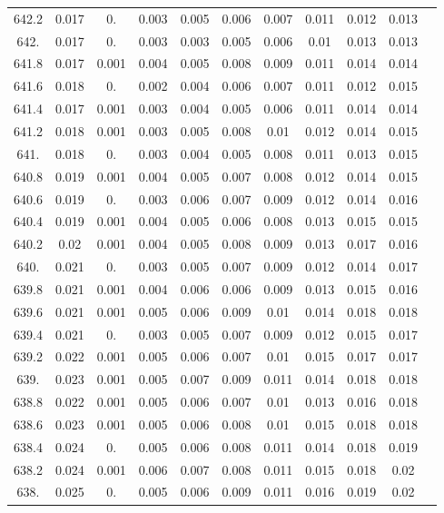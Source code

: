 \documentclass[12pt]{ctexart}
\numberwithin{equation}{section}
\begin{document}
\begin{longtable}{ccccccccccc}
642.2	&	0.017	&	0.	&	0.003	&	0.005	&	0.006	&	0.007	&	0.011	&	0.012	&	0.013	\\
642.	&	0.017	&	0.	&	0.003	&	0.003	&	0.005	&	0.006	&	0.01	&	0.013	&	0.013	\\
641.8	&	0.017	&	0.001	&	0.004	&	0.005	&	0.008	&	0.009	&	0.011	&	0.014	&	0.014	\\
641.6	&	0.018	&	0.	&	0.002	&	0.004	&	0.006	&	0.007	&	0.011	&	0.012	&	0.015	\\
641.4	&	0.017	&	0.001	&	0.003	&	0.004	&	0.005	&	0.006	&	0.011	&	0.014	&	0.014	\\
641.2	&	0.018	&	0.001	&	0.003	&	0.005	&	0.008	&	0.01	&	0.012	&	0.014	&	0.015	\\
641.	&	0.018	&	0.	&	0.003	&	0.004	&	0.005	&	0.008	&	0.011	&	0.013	&	0.015	\\
640.8	&	0.019	&	0.001	&	0.004	&	0.005	&	0.007	&	0.008	&	0.012	&	0.014	&	0.015	\\
640.6	&	0.019	&	0.	&	0.003	&	0.006	&	0.007	&	0.009	&	0.012	&	0.014	&	0.016	\\
640.4	&	0.019	&	0.001	&	0.004	&	0.005	&	0.006	&	0.008	&	0.013	&	0.015	&	0.015	\\
640.2	&	0.02	&	0.001	&	0.004	&	0.005	&	0.008	&	0.009	&	0.013	&	0.017	&	0.016	\\
640.	&	0.021	&	0.	&	0.003	&	0.005	&	0.007	&	0.009	&	0.012	&	0.014	&	0.017	\\
639.8	&	0.021	&	0.001	&	0.004	&	0.006	&	0.006	&	0.009	&	0.013	&	0.015	&	0.016	\\
639.6	&	0.021	&	0.001	&	0.005	&	0.006	&	0.009	&	0.01	&	0.014	&	0.018	&	0.018	\\
639.4	&	0.021	&	0.	&	0.003	&	0.005	&	0.007	&	0.009	&	0.012	&	0.015	&	0.017	\\
639.2	&	0.022	&	0.001	&	0.005	&	0.006	&	0.007	&	0.01	&	0.015	&	0.017	&	0.017	\\
639.	&	0.023	&	0.001	&	0.005	&	0.007	&	0.009	&	0.011	&	0.014	&	0.018	&	0.018	\\
638.8	&	0.022	&	0.001	&	0.005	&	0.006	&	0.007	&	0.01	&	0.013	&	0.016	&	0.018	\\
638.6	&	0.023	&	0.001	&	0.005	&	0.006	&	0.008	&	0.01	&	0.015	&	0.018	&	0.018	\\
638.4	&	0.024	&	0.	&	0.005	&	0.006	&	0.008	&	0.011	&	0.014	&	0.018	&	0.019	\\
638.2	&	0.024	&	0.001	&	0.006	&	0.007	&	0.008	&	0.011	&	0.015	&	0.018	&	0.02	\\
638.	&	0.025	&	0.	&	0.005	&	0.006	&	0.009	&	0.011	&	0.016	&	0.019	&	0.02	\\

\end{longtable}
\end{document}
